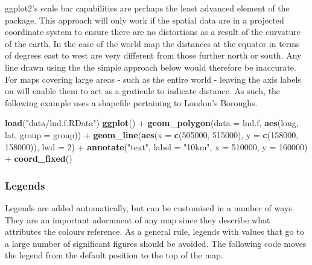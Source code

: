 \documentclass[]{article}
\newenvironment{Shaded}{}{}
\newcommand{\KeywordTok}[1]{\textcolor[rgb]{0.00,0.44,0.13}{\textbf{{#1}}}}
\newcommand{\DataTypeTok}[1]{\textcolor[rgb]{0.56,0.13,0.00}{{#1}}}
\newcommand{\DecValTok}[1]{\textcolor[rgb]{0.25,0.63,0.44}{{#1}}}
\newcommand{\StringTok}[1]{\textcolor[rgb]{0.25,0.44,0.63}{{#1}}}
\newcommand{\NormalTok}[1]{{#1}}
\begin{document}

ggplot2's scale bar capabilities are perhaps the least advanced element
of the package. This approach will only work if the spatial data are in
a projected coordinate system to ensure there are no distortions as a
result of the curvature of the earth. In the case of the world map the
distances at the equator in terms of degrees east to west are very
different from those further north or south. Any line drawn using the
the simple approach below would therefore be inaccurate. For maps
covering large areas - such as the entire world - leaving the axis
labels on will enable them to act as a graticule to indicate distance.
As such, the following example uses a shapefile pertaining to London's
Boroughs.

\begin{Shaded}
\begin{Highlighting}[]
\KeywordTok{load}\NormalTok{(}\StringTok{"data/lnd.f.RData"}\NormalTok{)}
\KeywordTok{ggplot}\NormalTok{() + }\KeywordTok{geom_polygon}\NormalTok{(}\DataTypeTok{data =} \NormalTok{lnd.f, }\KeywordTok{aes}\NormalTok{(long, lat, }\DataTypeTok{group =} \NormalTok{group)) + }\KeywordTok{geom_line}\NormalTok{(}\KeywordTok{aes}\NormalTok{(}\DataTypeTok{x =} \KeywordTok{c}\NormalTok{(}\DecValTok{505000}\NormalTok{, }
    \DecValTok{515000}\NormalTok{), }\DataTypeTok{y =} \KeywordTok{c}\NormalTok{(}\DecValTok{158000}\NormalTok{, }\DecValTok{158000}\NormalTok{)), }\DataTypeTok{lwd =} \DecValTok{2}\NormalTok{) + }\KeywordTok{annotate}\NormalTok{(}\StringTok{"text"}\NormalTok{, }\DataTypeTok{label =} \StringTok{"10km"}\NormalTok{, }
    \DataTypeTok{x =} \DecValTok{510000}\NormalTok{, }\DataTypeTok{y =} \DecValTok{160000}\NormalTok{) + }\KeywordTok{coord_fixed}\NormalTok{()}
\end{Highlighting}
\end{Shaded}

\subsubsection{Legends}

Legends are added automatically, but can be customised in a number of
ways. They are an important adornment of any map since they describe
what attributes the colours reference. As a general rule, legends with values that go to a large number of significant figures should be avoided. The following code moves the legend from the default position to the top of the map.
\end{document}
